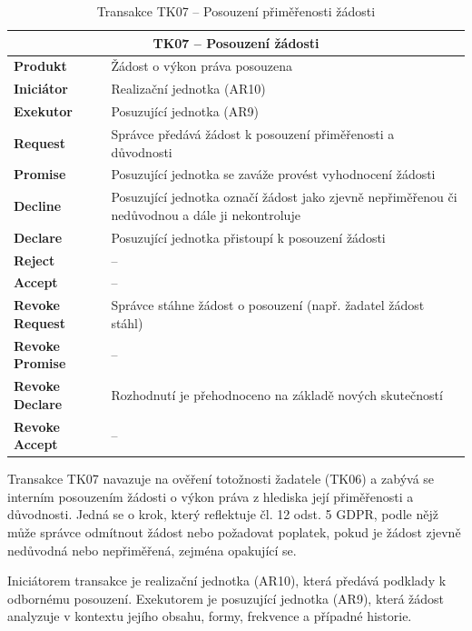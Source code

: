 \begin{itemize}
  \begin{table}[H]
    \centering
    \renewcommand{\arraystretch}{1.2}
    \begin{tabular}{|p{3.1cm}|p{9.9cm}|}
    \hline
    \multicolumn{2}{|c|}{\textbf{TK07 – Posouzení žádosti}} \\
    \hline
    \textbf{Produkt} & Žádost o výkon práva posouzena \\
    \hline
    \textbf{Iniciátor} & Realizační jednotka (AR10) \\
    \hline
    \textbf{Exekutor} & Posuzující jednotka (AR9) \\
    \hline
    \textbf{Request} & Správce předává žádost k posouzení přiměřenosti a důvodnosti \\
    \hline
    \textbf{Promise} & Posuzující jednotka se zaváže provést vyhodnocení žádosti \\
    \hline
    \textbf{Decline} & Posuzující jednotka označí žádost jako zjevně nepřiměřenou či nedůvodnou a dále ji nekontroluje \\
    \hline
    \textbf{Declare} & Posuzující jednotka přistoupí k posouzení žádosti \\
    \hline
    \textbf{Reject} & – \\
    \hline
    \textbf{Accept} & – \\
    \hline
    \textbf{Revoke Request} & Správce stáhne žádost o posouzení (např. žadatel žádost stáhl) \\
    \hline
    \textbf{Revoke Promise} & – \\
    \hline
    \textbf{Revoke Declare} & Rozhodnutí je přehodnoceno na základě nových skutečností \\
    \hline
    \textbf{Revoke Accept} & – \\
    \hline
    \end{tabular}
    \caption{Transakce TK07 – Posouzení přiměřenosti žádosti}
  \end{table}

  Transakce TK07 navazuje na ověření totožnosti žadatele (TK06) a zabývá se interním posouzením žádosti o výkon práva z hlediska její přiměřenosti a důvodnosti. Jedná se o krok, který reflektuje čl. 12 odst. 5 GDPR, podle nějž může správce odmítnout žádost nebo požadovat poplatek, pokud je žádost zjevně nedůvodná nebo nepřiměřená, zejména opakující se.

  Iniciátorem transakce je realizační jednotka (AR10), která předává podklady k odbornému posouzení. Exekutorem je posuzující jednotka (AR9), která žádost analyzuje v kontextu jejího obsahu, formy, frekvence a případné historie.


\end{itemize}
